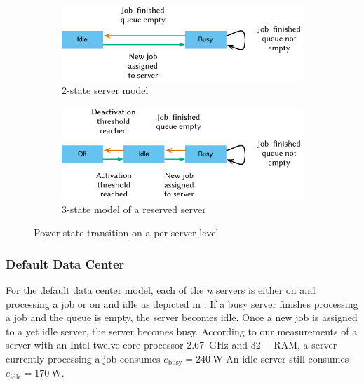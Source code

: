 \begin{figure}
	\begin{subfigure}[b]{\textwidth}
	\centering
	\includegraphics{cloud/data_centers/problem_formulation/figures/idle_busy}
	\caption{2-state server model}\label{fig:cloud:data_centers:problem_formulation:servers:idle_busy}
	\end{subfigure} 
	\begin{subfigure}[b]{\textwidth}
	\centering
	\includegraphics{cloud/data_centers/problem_formulation/figures/idle_busy_off}
	\caption{3-state model of a reserved server}\label{fig:cloud:data_centers:problem_formulation:idle_busy_off}
	\end{subfigure}

	\caption{Power state transition on a per server level}\label{fig:cloud:data_centers:problem_formulation:servers}
\end{figure}

\subsubsection*{Default Data Center}\label{sec:cloud:data_centers:problem_formulation:default_data_center}
For the default data center model, each of the \(n\) servers is either on and processing a job or on and idle as depicted in .
If a busy server finishes processing a job and the queue is empty, the server becomes idle. Once a new job is assigned to a yet idle server, the server becomes busy.
According to our measurements of a server with an Intel twelve core processor \SI{2.67}{\giga\hertz} and \SI{32}{\giga\byte} RAM, a server currently processing a job consumes \(e_{\text{busy}} = \SI{240}{\watt}\)
An idle server still consumes \(e_{\text{idle}} = \SI{170}{\watt}\).

